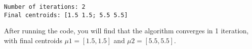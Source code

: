 \documentclass[11pt]{article}
\begin{document}
    \begin{Verbatim}[commandchars=\\\{\}]
Number of iterations: 2
Final centroids: [1.5 1.5; 5.5 5.5]
    \end{Verbatim}

    After running the code, you will find that the algorithm converges in 1
iteration, with final centroids \(μ1 = [1.5, 1.5]\) and
\(μ2 = [5.5, 5.5]\).


    
    
    
\end{document}
